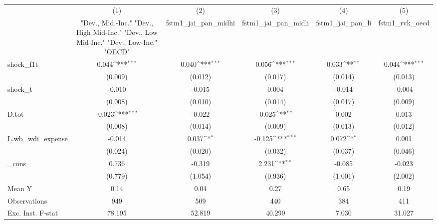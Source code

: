 {
\def\sym#1{\ifmmode^{#1}\else\(^{#1}\)\fi}
\begin{tabular}{l*{5}{c}}
\toprule
            &\multicolumn{1}{c}{(1)}&\multicolumn{1}{c}{(2)}&\multicolumn{1}{c}{(3)}&\multicolumn{1}{c}{(4)}&\multicolumn{1}{c}{(5)}\\
            &\multicolumn{1}{c}{ "Dev., Mid.-Inc." "Dev., High Mid-Inc." "Dev., Low Mid-Inc." "Dev., Low-Inc." "OECD" }&\multicolumn{1}{c}{fstm1\_jai\_pan\_midhi}&\multicolumn{1}{c}{fstm1\_jai\_pan\_midli}&\multicolumn{1}{c}{fstm1\_jai\_pan\_li}&\multicolumn{1}{c}{fstm1\_rvk\_oecd}\\
\midrule
shock\_f1t   &       0.044\sym{***}&       0.040\sym{***}&       0.056\sym{***}&       0.033\sym{**} &       0.044\sym{***}\\
            &     (0.009)         &     (0.012)         &     (0.017)         &     (0.014)         &     (0.013)         \\
\addlinespace
shock\_t     &      -0.010         &      -0.015         &       0.004         &      -0.014         &      -0.004         \\
            &     (0.008)         &     (0.010)         &     (0.014)         &     (0.017)         &     (0.009)         \\
\addlinespace
D.tot       &      -0.023\sym{***}&      -0.022         &      -0.025\sym{**} &       0.002         &       0.013         \\
            &     (0.008)         &     (0.014)         &     (0.009)         &     (0.013)         &     (0.012)         \\
\addlinespace
L.wb\_wdi\_expense&      -0.014         &       0.037\sym{*}  &      -0.125\sym{***}&       0.072\sym{*}  &       0.001         \\
            &     (0.024)         &     (0.020)         &     (0.032)         &     (0.037)         &     (0.046)         \\
\addlinespace
\_cons      &       0.736         &      -0.319         &       2.231\sym{**} &      -0.085         &      -0.023         \\
            &     (0.779)         &     (1.054)         &     (0.936)         &     (1.001)         &     (2.002)         \\
\midrule
Mean Y      &        0.14         &        0.04         &        0.27         &        0.65         &        0.19         \\
Observations&         949         &         509         &         440         &         384         &         411         \\
Exc. Inst. F-stat&      78.195         &      52.819         &      40.299         &       7.030         &      31.027         \\
\bottomrule
\end{tabular}
}
